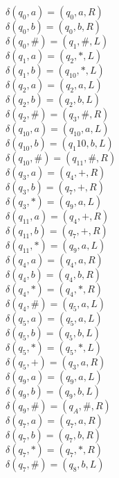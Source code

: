 \documentclass{article}
\begin{document}
\begin{enumerate}
\begin{enumerate}
    $\delta(q_0, a) = (q_0, a, R)$\\
    $\delta(q_0, b) = (q_0, b, R)$\\
    $\delta(q_0, \#) = (q_1, \#, L)$\\

    $\delta(q_1, a) = (q_2, *, L)$\\
    $\delta(q_1, b) = (q_{10}, *, L)$\\

    $\delta(q_2, a) = (q_2, a, L)$\\
    $\delta(q_2, b) = (q_2, b, L)$\\
    $\delta(q_2, \#) = (q_3, \#, R)$\\

    $\delta(q_{10}, a) = (q_{10}, a, L)$\\
    $\delta(q_{10}, b) = (q_1{10}, b, L)$\\
    $\delta(q_{10}, \#) = (q_{11}, \#, R)$\\


    $\delta(q_3, a) = (q_4, +, R)$\\
    $\delta(q_3, b) = (q_7, +, R)$\\
    $\delta(q_3, *) = (q_9, a, L)$\\

    $\delta(q_{11}, a) = (q_4, +, R)$\\
    $\delta(q_{11}, b) = (q_7, +, R)$\\
    $\delta(q_{11}, *) = (q_9, a, L)$\\


    $\delta(q_4, a) = (q_4, a, R)$\\
    $\delta(q_4, b) = (q_4, b, R)$\\
    $\delta(q_4, *) = (q_4, *, R)$\\
    $\delta(q_4, \#) = (q_5, a, L)$\\

    $\delta(q_5, a) = (q_5, a, L)$\\
    $\delta(q_5, b) = (q_5, b, L)$\\
    $\delta(q_5, *) = (q_5, *, L)$\\
    $\delta(q_5, +) = (q_3, a, R)$\\

    $\delta(q_9, a) = (q_9, a, L)$\\
    $\delta(q_9, b) = (q_9, b, L)$\\
    $\delta(q_9, \#) = (q_A, \#, R)$\\


    $\delta(q_7, a) = (q_7, a, R)$\\
    $\delta(q_7, b) = (q_7, b, R)$\\
    $\delta(q_7, *) = (q_7, *, R)$\\
    $\delta(q_7, \#) = (q_8, b, L)$\\


\end{enumerate}
\end{enumerate}
\end{document}
